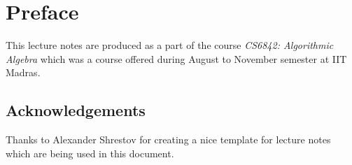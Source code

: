 \chapter*{Preface}

This lecture notes are produced as a part of the course \textit{CS6842: Algorithmic Algebra} which was a course offered during August to November semester at IIT Madras.

\section*{Acknowledgements}
Thanks to Alexander Shrestov for creating a nice template for lecture notes which are being used in this document.
